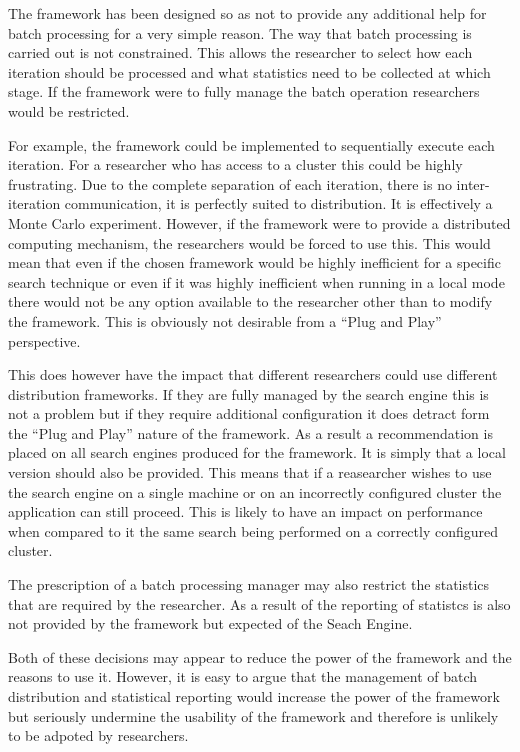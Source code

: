 The framework has been designed so as not to provide any additional help for batch processing for a very simple reason.
The way that batch processing is carried out is not constrained.
This allows the researcher to select how each iteration should be processed and what statistics need to be collected at which stage.
If the framework were to fully manage the batch operation researchers would be restricted.

For example, the framework could be implemented to sequentially execute each iteration.
For a researcher who has access to a cluster this could be highly frustrating.
Due to the complete separation of each iteration, there is no inter-iteration communication, it is perfectly suited to distribution.
It is effectively a Monte Carlo experiment.
However, if the framework were to provide a distributed computing mechanism, the researchers would be forced to use this.
This would mean that even if the chosen framework would be highly inefficient for a specific search technique or even if it was highly inefficient when running in a local mode there would not be any option available to the researcher other than to modify the framework.
This is obviously not desirable from a ``Plug and Play'' perspective.

This does however have the impact that different researchers could use different distribution frameworks.
If they are fully managed by the search engine this is not a problem but if they require additional configuration it does detract form the ``Plug and Play'' nature of the framework.
As a result a recommendation is placed on all search engines produced for the framework.
It is simply that a local version should also be provided.
This means that if a reasearcher wishes to use the search engine on a single machine or on an incorrectly configured cluster the application can still proceed.
This is likely to have an impact on performance when compared to it the same search being performed on a correctly configured cluster.

The prescription of a batch processing manager may also restrict the statistics that are required by the researcher.
As a result of the reporting of statistcs is also not provided by the framework but expected of the Seach Engine.

Both of these decisions may appear to reduce the power of the framework and the reasons to use it.
However, it is easy to argue that the management of batch distribution and statistical reporting would increase the power of the framework but seriously undermine the usability of the framework and therefore is unlikely to be adpoted by researchers.

